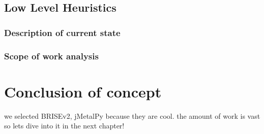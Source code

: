 \subsection{Low Level Heuristics}
\subsubsection{Description of current state}
\subsubsection{Scope of work analysis}

\section{Conclusion of concept}
we selected BRISEv2, jMetalPy because they are cool.
the amount of work is vast so lets dive into it in the next chapter!
